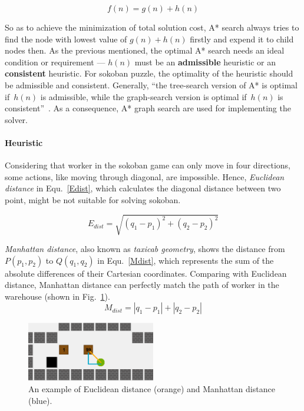 \documentclass{article}
\begin{document}
\begin{equation}
f(n)=g(n)+h(n)
\label{Astar}
\end{equation}

So as to achieve the minimization of total solution cost, A* search always tries to find the node with lowest value of $g(n)+h(n)$ firstly and expend it to child nodes then. As the previous mentioned, the optimal A* search needs an ideal condition or requirement --- $h(n)$ must be an \textbf{admissible} heuristic or an \textbf{consistent} heuristic. For sokoban puzzle, the optimality of the heuristic should be admissible and consistent. Generally, ``the tree-search version of A* is optimal if~$h(n)$ is admissible, while the graph-search version is optimal if~$h(n)$ is consistent''~\cite{AIAMA}. As a consequence, A* graph search are used for implementing the solver. 

\paragraph{Heuristic} Considering that worker in the sokoban game can only move in four directions, some actions, like moving through diagonal, are impossible. Hence, \textit{Euclidean distance} in Equ.~\ref{Edist}, which calculates the diagonal distance between two point, might be not suitable for solving sokoban. 

\begin{equation}
    E_{dist} = \sqrt{(q_1-p_1)^2 + (q_2 - p_2)^2}
    \label{Edist}
\end{equation}

\textit{Manhattan distance}, also known as \textit{taxicab geometry}, shows the distance from $P(p_1,p_2)$ to $Q(q_1, q_2)$ in Equ.~\ref{Mdist}, which represents the sum of the absolute differences of their Cartesian coordinates. Comparing with Euclidean distance, Manhattan distance can perfectly match the path of worker in the warehouse (shown in Fig.~\ref{fig:distance}).
\begin{equation}
M_{dist} = |q_1 - p_1| + |q_2 - p_2|
\label{Mdist}
\end{equation}

\begin{figure} %
    \centering
    \includegraphics[width=0.5\textwidth]{image/distance.eps}
    \caption{An example of Euclidean distance (orange) and Manhattan distance (blue).}
    \label{fig:distance}
\end{figure}
\end{document}

